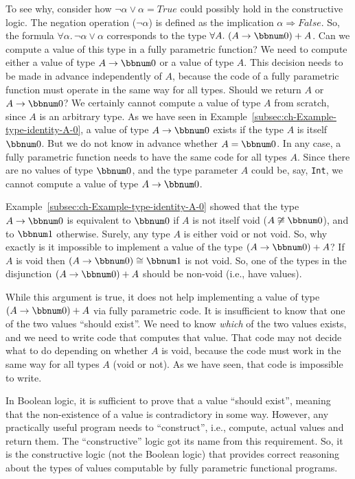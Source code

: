 To see why, consider how $\neg\alpha\vee\alpha=True$ could possibly
hold in the constructive logic. The negation operation ($\neg\alpha$)
is defined as the implication $\alpha\Rightarrow False$. So, the
formula $\forall\alpha.\,\neg\alpha\vee\alpha$ corresponds to the
type $\forall A.\,\left(A\rightarrow\bbnum 0\right)+A$. Can we compute
a value of this type in a fully parametric function? We need to compute
either a value of type $A\rightarrow\bbnum 0$ or a value of type
$A$. This decision needs to be made in advance independently of $A$,
because the code of a fully parametric function must operate in the
same way for all types. Should we return $A$ or $A\rightarrow\bbnum 0$?
We certainly cannot compute a value of type $A$ from scratch, since
$A$ is an arbitrary type. As we have seen in Example~\ref{subsec:ch-Example-type-identity-A-0},
a value of type $A\rightarrow\bbnum 0$ exists if the type $A$ is
itself $\bbnum 0$. But we do not know in advance whether $A=\bbnum 0$.
In any case, a fully parametric function needs to have the same code
for all types $A$. Since there are no values of type $\bbnum 0$,
and the type parameter $A$ could be, say, \lstinline!Int!, we cannot
compute a value of type $A\rightarrow\bbnum 0$.

Example~\ref{subsec:ch-Example-type-identity-A-0} showed that the
type $A\rightarrow\bbnum 0$ is equivalent to $\bbnum 0$ if $A$
is not itself void ($A\not\cong\bbnum 0$), and to $\bbnum 1$ otherwise.
Surely, any type $A$ is either void or not void. So, why exactly
is it impossible to implement a value of the type $\left(A\rightarrow\bbnum 0\right)+A$?
If $A$ is void then $\left(A\rightarrow\bbnum 0\right)\cong\bbnum 1$
is not void. So, one of the types in the disjunction $\left(A\rightarrow\bbnum 0\right)+A$
should be non-void (i.e., have values).

While this argument is true, it does not help implementing a value
of type $\left(A\rightarrow\bbnum 0\right)+A$ via fully parametric
code. It is insufficient to know that one of the two values \textsf{``}should
exist\textsf{''}. We need to know \emph{which} of the two values exists, and
we need to write code that computes that value. That code may not
decide what to do depending on whether $A$ is void, because the code
must work in the same way for all types $A$ (void or not). As we
have seen, that code is impossible to write.

In Boolean logic, it is sufficient to prove that a value \textsf{``}should
exist\textsf{''}, meaning that the non-existence of a value is contradictory
in some way. However, any practically useful program needs to \textsf{``}construct\textsf{''},
i.e., compute, actual values and return them. The \textsf{``}constructive\textsf{''}
logic got its name from this requirement. So, it is the constructive
logic (not the Boolean logic) that provides correct reasoning about
the types of values computable by fully parametric functional programs.

